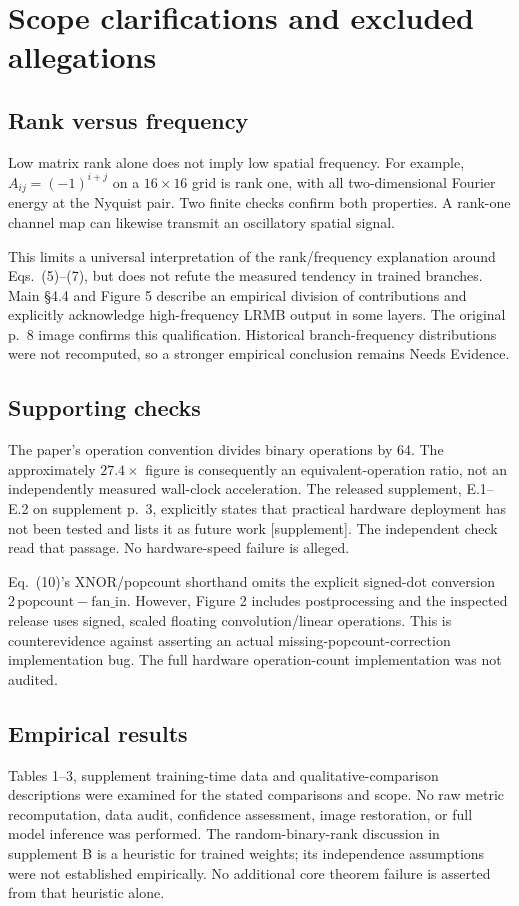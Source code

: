 \documentclass[10pt]{article}
\begin{document}
\section*{Scope clarifications and excluded allegations}
\subsection*{Rank versus frequency}
Low matrix rank alone does not imply low spatial frequency. For example, \(A_{ij}=(-1)^{i+j}\) on a \(16\times16\) grid is rank one, with all two-dimensional Fourier energy at the Nyquist pair. Two finite checks confirm both properties. A rank-one channel map can likewise transmit an oscillatory spatial signal.\par
This limits a universal interpretation of the rank/frequency explanation around Eqs. (5)–(7), but does not refute the measured tendency in trained branches. Main §4.4 and Figure 5 describe an empirical division of contributions and explicitly acknowledge high-frequency LRMB output in some layers. The original p. 8 image confirms this qualification. Historical branch-frequency distributions were not recomputed, so a stronger empirical conclusion remains Needs Evidence.\par
\subsection*{Supporting checks}
The paper’s operation convention divides binary operations by 64. The approximately \(27.4\times\) figure is consequently an equivalent-operation ratio, not an independently measured wall-clock acceleration. The released supplement, E.1–E.2 on supplement p. 3, explicitly states that practical hardware deployment has not been tested and lists it as future work [supplement]. The independent check read that passage. No hardware-speed failure is alleged.\par
Eq. (10)’s XNOR/popcount shorthand omits the explicit signed-dot conversion \(2\,\mathrm{popcount}-\mathrm{fan\_in}\). However, Figure 2 includes postprocessing and the inspected release uses signed, scaled floating convolution/linear operations. This is counterevidence against asserting an actual missing-popcount-correction implementation bug. The full hardware operation-count implementation was not audited.\par
\subsection*{Empirical results}
Tables 1–3, supplement training-time data and qualitative-comparison descriptions were examined for the stated comparisons and scope. No raw metric recomputation, data audit, confidence assessment, image restoration, or full model inference was performed. The random-binary-rank discussion in supplement B is a heuristic for trained weights; its independence assumptions were not established empirically. No additional core theorem failure is asserted from that heuristic alone.\par
\end{document}
